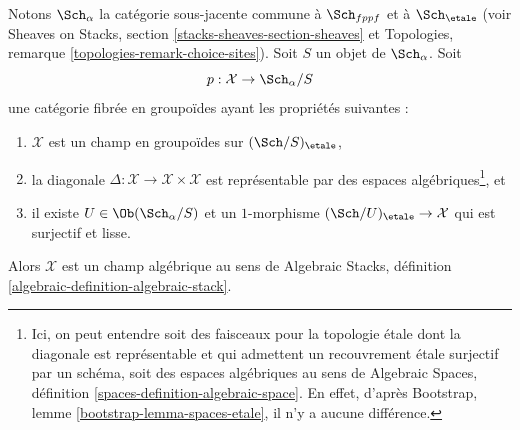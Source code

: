 \begin{lemma}
\label{lemma-stacks-etale}
Notons $\Sch_\alpha$ la catégorie sous-jacente commune à $\Sch_{fppf}$
et à $\Sch_\etale$ (voir
Sheaves on Stacks, section \ref{stacks-sheaves-section-sheaves} et
Topologies, remarque \ref{topologies-remark-choice-sites}). Soit $S$ un objet
de $\Sch_\alpha$. Soit
$$
p : \mathcal{X} \to \Sch_\alpha/S
$$
une catégorie fibrée en groupoïdes ayant les propriétés suivantes :
\begin{enumerate}
\item $\mathcal{X}$ est un champ en groupoïdes sur $(\Sch/S)_\etale$,
\item la diagonale $\Delta : \mathcal{X} \to \mathcal{X} \times \mathcal{X}$
est représentable par des espaces algébriques\footnote{Ici, on peut entendre
soit des faisceaux pour la topologie étale dont la diagonale est représentable et qui
admettent un recouvrement étale surjectif par un schéma, soit des espaces algébriques
au sens de
Algebraic Spaces, définition \ref{spaces-definition-algebraic-space}.
En effet, d'après Bootstrap, lemme \ref{bootstrap-lemma-spaces-etale},
il n'y a aucune différence.}, et
\item il existe $U \in \Ob(\Sch_\alpha/S)$
et un $1$-morphisme $(\Sch/U)_\etale \to \mathcal{X}$
qui est surjectif et lisse.
\end{enumerate}
Alors $\mathcal{X}$ est un champ algébrique au sens de
Algebraic Stacks, définition \ref{algebraic-definition-algebraic-stack}.
\end{lemma}


